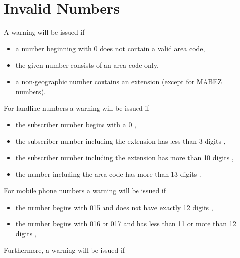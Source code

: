 \documentclass[numbers=noenddot]{scrreprt}
\newcommand\UeberschriftUngueltig{\section{Invalid Numbers}}
\newcommand\WarnungWenn{A warning will be issued if}
\begin{document}
\UeberschriftUngueltig
\WarnungWenn
\begin{itemize}
\item a number beginning with 0 does not contain a valid area code,
\item the given number consists of an area code only,
\item a non-geographic number contains an extension (except for MABEZ numbers).
\end{itemize}
For landline numbers a warning will be issued if
\begin{itemize}
\item the subscriber number begins with a 0 \cite[5]{BNA-nummernplan},
\item the subscriber number including the extension has less than 3 digits \cite[5]{BNA-nummernplan},
\item the subscriber number including the extension has more than 10 digits \cite[2]{BNA-Struktur},
\item the number including the area code has more than 13 digits \cite[2]{BNA-Struktur}.
\end{itemize}
For mobile phone numbers a warning will be issued if
\begin{itemize}
\item the number begins with 015 and does not have exactly 12 digits \cite[49\psq]{BNA-konzept},
\item the number begins with 016 or 017 and has less than 11 or more than 12 digits \cite[50]{BNA-konzept},
\end{itemize}
Furthermore, a warning will be issued if
\end{document}

